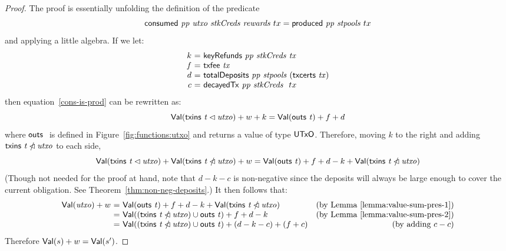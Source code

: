 \begin{proof}
  The proof is essentially unfolding the definition of the predicate
  \begin{equation}
    \label{cons-is-prod}
    \mathsf{consumed}~ \mathit{pp}~ \mathit{utxo}~ \mathit{stkCreds}~ \mathit{rewards}~{tx} = \mathsf{produced}~ \mathit{pp}~ \mathit{stpools}~{tx}
  \end{equation}
  and applying a little algebra.
%
If we let:
  \begin{equation*}
    \begin{array}{r@{~=~}l}
      k & \keyRefunds{pp}{stkCreds}{tx} \\
      f & \txfee{tx} \\
      d & \totalDeposits{pp}{stpools}{(\txcerts{tx})} \\
      c & \decayedTx{pp}{stkCreds}~{tx} \\
    \end{array}
  \end{equation*}
  then equation~\ref{cons-is-prod} can be rewritten as:
  \begin{equation*}
    \mathsf{Val}(\mathsf{txins}~ \mathit{t} \lhd{\ensuremath{\mathit{utxo}}}) + w + k = \mathsf{Val}(\mathsf{outs}~ \mathit{t}) + f + d
  \end{equation*}
  where $\mathsf{outs}~ \mathit{}$ is defined in Figure~\ref{fig:functions:utxo} and returns a value of type $\mathsf{UTxO}$.
  Therefore, moving $k$ to the right and adding $\mathsf{txins}~ \mathit{t} \mathbin{\slashed{\lhd}}{\mathit{utxo}}$ to each side,
  \begin{equation*}
    \mathsf{Val}(\mathsf{txins}~ \mathit{t} \lhd{\ensuremath{\mathit{utxo}}}) + \mathsf{Val}(\mathsf{txins}~ \mathit{t} \mathbin{\slashed{\lhd}}{\mathit{utxo}}) + w
    = \mathsf{Val}(\mathsf{outs}~ \mathit{t}) + f + d - k + \mathsf{Val}(\mathsf{txins}~ \mathit{t} \mathbin{\slashed{\lhd}}{\mathit{utxo}})
  \end{equation*}
  (Though not needed for the proof at hand,
  note that $d-k-c$ is non-negative since the deposits will always be large enough to cover
  the current obligation. See Theorem~\ref{thm:non-neg-deposits}.)
%
  It then follows that:
  \begin{equation*}
    \begin{array}{r@{~=~}lr}
      \Val(\var{utxo}) + w
    & \Val(\outs{t}) + f + d - k + \Val(\txins{t} \subtractdom{\var{utxo}})
    & \text{(by Lemma~\ref{lemma:value-sum-pres-1})}
    \\
    & \Val((\txins{t} \subtractdom{\var{utxo}})\cup\outs{t}) + f + d - k
    & \text{(by Lemma~\ref{lemma:value-sum-pres-2})}
    \\
    & \Val((\txins{t} \subtractdom{\var{utxo}})\cup\outs{t}) + (d-k-c) + (f+c)
    & \text{(by adding $c-c$)}
    \end{array}
  \end{equation*}
  Therefore $\mathsf{Val}(s) + w = \mathsf{Val}(s')$.
\end{proof}

